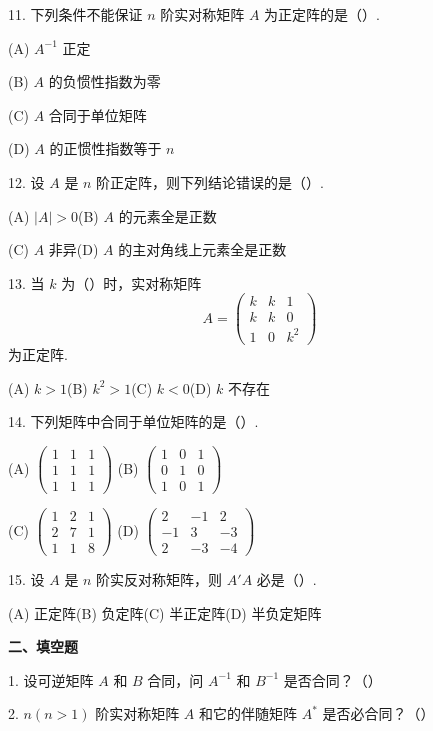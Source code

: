 \documentclass[UTF8,12pt,a4paper,fontset=fandol]{ctexart}
\begin{document}
11. 下列条件不能保证 $n$ 阶实对称矩阵 $A$ 为正定阵的是（\quad ）.

(A) $A^{-1}$ 正定

(B) $A$ 的负惯性指数为零

(C) $A$ 合同于单位矩阵

(D) $A$ 的正惯性指数等于 $n$

12. 设 $A$ 是 $n$ 阶正定阵，则下列结论错误的是（\quad ）.

(A) $|A|>0$\qquad (B) $A$ 的元素全是正数

(C) $A$ 非异\qquad (D) $A$ 的主对角线上元素全是正数

13. 当 $k$ 为（\quad ）时，实对称矩阵
\[
A=\left(\begin{array}{ccc}
k & k & 1\\
k & k & 0\\
1 & 0 & k^2
\end{array}\right)
\]
为正定阵.

(A) $k>1$\qquad (B) $k^2>1$\qquad (C) $k<0$\qquad (D) $k$ 不存在

14. 下列矩阵中合同于单位矩阵的是（\quad ）.

(A) $\left(\begin{array}{ccc}1&1&1\\ 1&1&1\\ 1&1&1\end{array}\right)$
\qquad
(B) $\left(\begin{array}{ccc}1&0&1\\ 0&1&0\\ 1&0&1\end{array}\right)$

(C) $\left(\begin{array}{ccc}1&2&1\\ 2&7&1\\ 1&1&8\end{array}\right)$
\qquad
(D) $\left(\begin{array}{ccc}2&-1&2\\ -1&3&-3\\ 2&-3&-4\end{array}\right)$

15. 设 $A$ 是 $n$ 阶实反对称矩阵，则 $A'A$ 必是（\quad ）.

(A) 正定阵\qquad (B) 负定阵\qquad (C) 半正定阵\qquad (D) 半负定矩阵

\noindent\textbf{二、填空题}

1. 设可逆矩阵 $A$ 和 $B$ 合同，问 $A^{-1}$ 和 $B^{-1}$ 是否合同？（\quad ）

2. $n(n>1)$ 阶实对称矩阵 $A$ 和它的伴随矩阵 $A^*$ 是否必合同？（\quad ）
\end{document}
